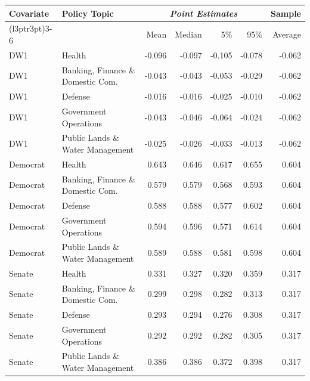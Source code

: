 
\begin{tabular}{llrrrrr}
\toprule
\multirow{2}{*}{Covariate} & \multirow{2}{*}{Policy Topic} & \multicolumn{4}{c}{\textit{Point Estimates}} & Sample\\
\cmidrule(l{3pt}r{3pt}){3-6}
& & Mean & Median & 5\% & 95\% & Average\\
\midrule
DW1 & Health & -0.096 & -0.097 & -0.105 & -0.078 & -0.062\\
DW1 & Banking, Finance \& Domestic Com. & -0.043 & -0.043 & -0.053 & -0.029 & -0.062\\
DW1 & Defense & -0.016 & -0.016 & -0.025 & -0.010 & -0.062\\
DW1 & Government Operations & -0.043 & -0.046 & -0.064 & -0.024 & -0.062\\
DW1 & Public Lands \& Water Management & -0.025 & -0.026 & -0.033 & -0.013 & -0.062\\
\midrule
Democrat & Health & 0.643 & 0.646 & 0.617 & 0.655 & 0.604\\
Democrat & Banking, Finance \& Domestic Com. & 0.579 & 0.579 & 0.568 & 0.593 & 0.604\\
Democrat & Defense & 0.588 & 0.588 & 0.577 & 0.602 & 0.604\\
Democrat & Government Operations & 0.594 & 0.596 & 0.571 & 0.614 & 0.604\\
Democrat & Public Lands \& Water Management & 0.589 & 0.588 & 0.581 & 0.598 & 0.604\\
\midrule
Senate & Health & 0.331 & 0.327 & 0.320 & 0.359 & 0.317\\
Senate & Banking, Finance \& Domestic Com. & 0.299 & 0.298 & 0.282 & 0.313 & 0.317\\
Senate & Defense & 0.293 & 0.294 & 0.276 & 0.308 & 0.317\\
Senate & Government Operations & 0.292 & 0.292 & 0.282 & 0.305 & 0.317\\
Senate & Public Lands \& Water Management & 0.386 & 0.386 & 0.372 & 0.398 & 0.317\\
\bottomrule
\end{tabular}

